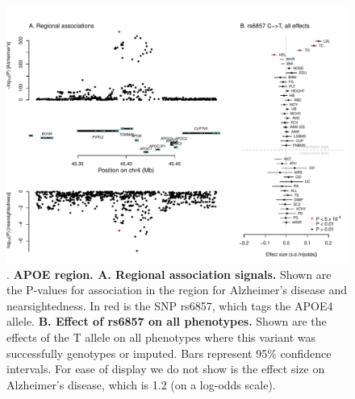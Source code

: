 \documentclass[11pt,titlepage]{article}
\begin{document}
\begin{figure}
\begin{center}
\includegraphics[scale = 0.6]{figs/APOE_region.pdf}
\caption{. \textbf{APOE region. A. Regional association signals.} Shown are the P-values for association in the region for Alzheimer's disease and nearsightedness. In red is the SNP rs6857, which tags the APOE4 allele. \textbf{B. Effect of rs6857 on all phenotypes.} Shown are the effects of the T allele on all phenotypes where this variant was successfully genotypes or imputed. Bars represent 95\% confidence intervals. For ease of display we do not show is the effect size on Alzheimer's disease, which is 1.2 (on a log-odds scale).}\label{f_apoe}
\end{center}
\end{figure}
\end{document}
